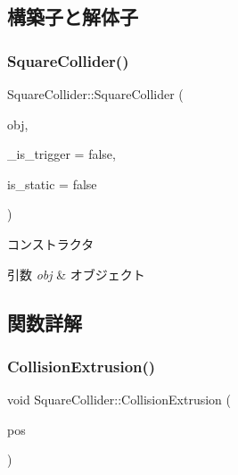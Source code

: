 \subsection{構築子と解体子}
\mbox{\label{class_square_collider_a354753b61e7fa39cb5e7aadcddb78910}} 
\subsubsection{\texorpdfstring{Square\+Collider()}{SquareCollider()}}
{\footnotesize\ttfamily Square\+Collider\+::\+Square\+Collider (\begin{DoxyParamCaption}\item[{\mbox{\hyperlink{class_object_base}{Object\+Base}} $\ast$}]{obj,  }\item[{bool}]{\+\_\+is\+\_\+trigger = {\ttfamily false},  }\item[{bool}]{is\+\_\+static = {\ttfamily false} }\end{DoxyParamCaption})}



コンストラクタ 


\begin{DoxyParams}{引数}
{\em obj} & オブジェクト \\
\hline
\end{DoxyParams}


\subsection{関数詳解}
\mbox{\label{class_square_collider_a68cf6f1607d0d460e3a4ba31a49153d8}} 
\subsubsection{\texorpdfstring{Collision\+Extrusion()}{CollisionExtrusion()}}
{\footnotesize\ttfamily void Square\+Collider\+::\+Collision\+Extrusion (\begin{DoxyParamCaption}\item[{const \mbox{\hyperlink{transform_8h_afb0c5e21d4133ff4f200992c0b534e1b}{V\+E\+C2}} \&}]{pos }\end{DoxyParamCaption})}



